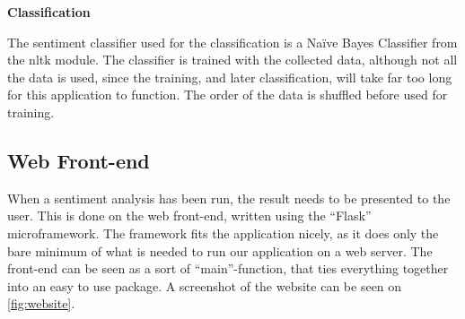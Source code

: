 \documentclass[Main]{subfiles}
\begin{document}
\textbf{Classification}

The sentiment classifier used for the classification is a Naïve Bayes Classifier from the nltk module. The classifier is trained with the collected data, although not all the data is used, since the training, and later classification, will take far too long for this application to function. The order of the data is shuffled before used for training. 



\subsection{Web Front-end}
When a sentiment analysis has been run, the result needs to be presented to the user. 
This is done on the web front-end, written using the ``Flask'' microframework. 
The framework fits the application nicely, as it does only the bare minimum of what is needed to run our application on a web server.
The front-end can be seen as a sort of ``main''-function, that ties everything together into an easy to use package.
A screenshot of the website can be seen on \autoref{fig:website}.
\end{document}
